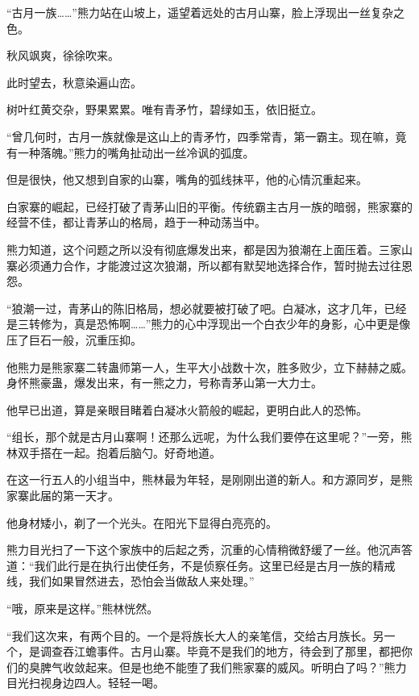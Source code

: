 
\begin{this_body}

“古月一族……”熊力站在山坡上，遥望着远处的古月山寨，脸上浮现出一丝复杂之色。

秋风飒爽，徐徐吹来。

此时望去，秋意染遍山峦。

树叶红黄交杂，野果累累。唯有青矛竹，碧绿如玉，依旧挺立。

“曾几何时，古月一族就像是这山上的青矛竹，四季常青，第一霸主。现在嘛，竟有一种落魄。”熊力的嘴角扯动出一丝冷讽的弧度。

但是很快，他又想到自家的山寨，嘴角的弧线抹平，他的心情沉重起来。

白家寨的崛起，已经打破了青茅山旧的平衡。传统霸主古月一族的暗弱，熊家寨的经营不佳，都让青茅山的格局，趋于一种动荡当中。

熊力知道，这个问题之所以没有彻底爆发出来，都是因为狼潮在上面压着。三家山寨必须通力合作，才能渡过这次狼潮，所以都有默契地选择合作，暂时抛去过往恩怨。

“狼潮一过，青茅山的陈旧格局，想必就要被打破了吧。白凝冰，这才几年，已经是三转修为，真是恐怖啊……”熊力的心中浮现出一个白衣少年的身影，心中更是像压了巨石一般，沉重压抑。

他熊力是熊家寨二转蛊师第一人，生平大小战数十次，胜多败少，立下赫赫之威。身怀熊豪蛊，爆发出来，有一熊之力，号称青茅山第一大力士。

他早已出道，算是亲眼目睹着白凝冰火箭般的崛起，更明白此人的恐怖。

“组长，那个就是古月山寨啊！还那么远呢，为什么我们要停在这里呢？”一旁，熊林双手搭在一起。抱着后脑勺。好奇地道。

在这一行五人的小组当中，熊林最为年轻，是刚刚出道的新人。和方源同岁，是熊家寨此届的第一天才。

他身材矮小，剃了一个光头。在阳光下显得白亮亮的。

熊力目光扫了一下这个家族中的后起之秀，沉重的心情稍微舒缓了一丝。他沉声答道：“我们此行是在执行出使任务，不是侦察任务。这里已经是古月一族的精戒线，我们如果冒然进去，恐怕会当做敌人来处理。”

“哦，原来是这样。”熊林恍然。

“我们这次来，有两个目的。一个是将族长大人的亲笔信，交给古月族长。另一个，是调查吞江蟾事件。古月山寨。毕竟不是我们的地方，待会到了那里，都把你们的臭脾气收敛起来。但是也绝不能堕了我们熊家寨的威风。听明白了吗？”熊力目光扫视身边四人。轻轻一喝。


\end{this_body}

